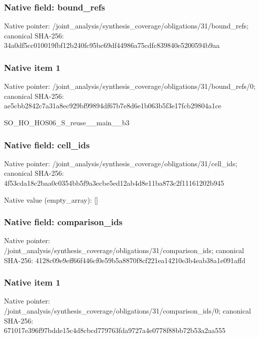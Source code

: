 \documentclass[10pt,a4paper]{article}
\begin{document}
\subsubsection{Native field: bound\_\allowbreak{}refs}
Native pointer: /joint\_\allowbreak{}analysis/synthesis\_\allowbreak{}coverage/obligations/31/bound\_\allowbreak{}refs; canonical SHA-256: 34a0df5cc010019fbf12b240fc95bc69df44986a75cdfc839840e5200594b9aa

\subsubsection{Native item 1}
Native pointer: /joint\_\allowbreak{}analysis/synthesis\_\allowbreak{}coverage/obligations/31/bound\_\allowbreak{}refs/0; canonical SHA-256: ae5cbb2842c7a31a8ec929bf99894df67b7e8d6e1b063b5f3e17fcb29804a1ce

\begingroup\raggedright\sloppy SO\_\allowbreak{}HO\_\allowbreak{}HOS06\_\allowbreak{}S\_\allowbreak{}reuse\_\allowbreak{}\_\allowbreak{}main\_\allowbreak{}\_\allowbreak{}b3\par\endgroup

\subsubsection{Native field: cell\_\allowbreak{}ids}
Native pointer: /joint\_\allowbreak{}analysis/synthesis\_\allowbreak{}coverage/obligations/31/cell\_\allowbreak{}ids; canonical SHA-256: 4f53cda18c2baa0c0354bb5f9a3ecbe5ed12ab4d8e11ba873c2f11161202b945

Native value (empty\_\allowbreak{}array): []

\subsubsection{Native field: comparison\_\allowbreak{}ids}
Native pointer: /joint\_\allowbreak{}analysis/synthesis\_\allowbreak{}coverage/obligations/31/comparison\_\allowbreak{}ids; canonical SHA-256: 4128c09e9eff66f446cf0e59b5a8870f8cf221ea14210e3b4eab38a1e091affd

\subsubsection{Native item 1}
Native pointer: /joint\_\allowbreak{}analysis/synthesis\_\allowbreak{}coverage/obligations/31/comparison\_\allowbreak{}ids/0; canonical SHA-256: 671017e396f97bdde15c4d8cbcd779763fda9727a4e0778f88bb72b53a2aa555
\end{document}
